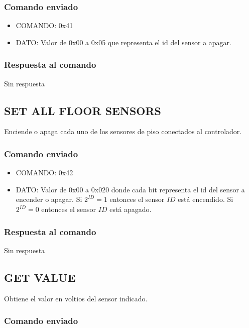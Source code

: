 \documentclass[a4paper,10pt]{article}
\begin{document}
\subsubsection*{Comando enviado}

\begin{itemize}
	\item{COMANDO:} 0x41
	\item{DATO:} Valor de 0x00 a 0x05 que representa el id del sensor a apagar.
\end{itemize}

\subsubsection*{Respuesta al comando}

Sin respuesta

\subsection{SET ALL FLOOR SENSORS}
\label{set_all_fs}

Enciende o apaga cada uno de los sensores de piso conectados al controlador.

\subsubsection*{Comando enviado}

\begin{itemize}
	\item{COMANDO:} 0x42
	\item{DATO:} Valor de 0x00 a 0x020 donde cada bit representa el id del sensor a encender o apagar.
	Si $2^{ID} = 1$ entonces el sensor $ID$ est\'a encendido.
	Si $2^{ID} = 0$ entonces el sensor $ID$ est\'a apagado.
\end{itemize}

\subsubsection*{Respuesta al comando}

Sin respuesta

\subsection{GET VALUE}
\label{get_value_fs}

Obtiene el valor en voltios del sensor indicado.

\subsubsection*{Comando enviado}
\end{document}
